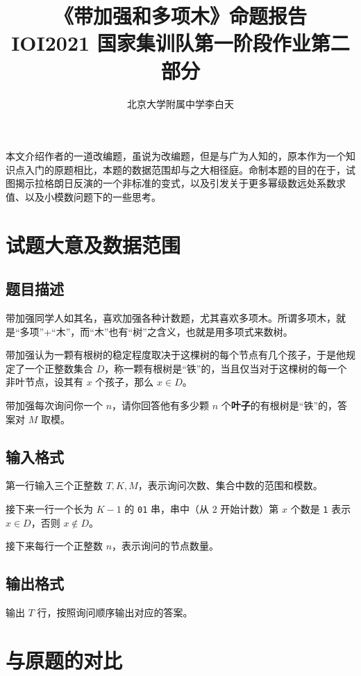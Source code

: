 \documentclass[12pt]{ctexart}
\title{《带加强和多项木》命题报告\\
\large IOI2021 国家集训队第一阶段作业第二部分}
\author{北京大学附属中学\quad 李白天}
\begin{document}
\maketitle

本文介绍作者的一道改编题，虽说为改编题，但是与广为人知的，原本作为一个知识点入门的原题相比，本题的数据范围却与之大相径庭。命制本题的目的在于，试图揭示拉格朗日反演的一个非标准的变式，以及引发关于更多幂级数远处系数求值、以及小模数问题下的一些思考。

\section{试题大意及数据范围}

\subsection{题目描述}

带加强同学人如其名，喜欢加强各种计数题，尤其喜欢多项木。所谓多项木，就是“多项”+“木”，而“木”也有“树”之含义，也就是用多项式来数树。

带加强认为一颗有根树的稳定程度取决于这棵树的每个节点有几个孩子，于是他规定了一个正整数集合 $D$，称一颗有根树是“铁”的，当且仅当对于这棵树的每一个非叶节点，设其有 $x$ 个孩子，那么 $x\in D$。

带加强每次询问你一个 $n$，请你回答他有多少颗 $n$ 个\textbf{叶子}的有根树是“铁”的，答案对 $M$ 取模。

\subsection{输入格式}

第一行输入三个正整数 $T, K, M$，表示询问次数、集合中数的范围和模数。

接下来一行一个长为 $K-1$ 的 \texttt{01} 串，串中（从 $2$ 开始计数）第 $x$ 个数是 \texttt{1} 表示 $x\in D$，否则 $x\notin D$。

接下来每行一个正整数 $n$，表示询问的节点数量。

\subsection{输出格式}

输出 $T$ 行，按照询问顺序输出对应的答案。

\section{与原题的对比}
\end{document}
